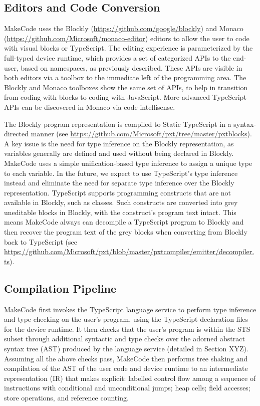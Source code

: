 \subsection{Editors and Code Conversion}

MakeCode uses the Blockly (\url{https://github.com/google/blockly}) and Monaco 
(\url{https://github.com/Microsoft/monaco-editor}) editors to allow the user to code with
visual blocks or TypeScript. The editing experience is parameterized by the full-typed device
runtime, which provides a set of categorized APIs to the end-user, based on namespaces, as
previously described. These APIs are visible in both editors via a toolbox to the immediate
left of the programming area. The Blockly and Monaco toolboxes show the same set of APIs, to
help in transition from coding with blocks to coding with JavaScript. More advanced TypeScript
APIs can be discovered in Monaco via code intellisense.

The Blockly program representation is compiled to Static TypeScript in a syntax-directed manner
(see \url{https://github.com/Microsoft/pxt/tree/master/pxtblocks}). A key issue is the need for
type inference on the Blockly representation, as variables generally are defined and used without
being declared in Blockly. MakeCode uses a simple unification-based type inference to assign a
unique type to each variable.  In the future, we expect to use TypeScript's type inference instead
and eliminate the need for separate type inference over the Blockly representation. 
TypeScript supports programming constructs that are not available in Blockly, such as classes.
Such constructs are converted into grey uneditable blocks in Blockly, with the construct's program
text intact. This means MakeCode always can decompile a TypeScript program to Blockly and then recover
the program text of the grey blocks when converting from Blockly back to TypeScript
 (see \url{https://github.com/Microsoft/pxt/blob/master/pxtcompiler/emitter/decompiler.ts}). 

\subsection{Compilation Pipeline}

MakeCode first invokes the TypeScript language service to perform type inference and type checking on the 
user's program, using the TypeScript declaration files for the device runtime.   It then checks that the
user's program is within the STS subset through additional syntactic and type checks over the adorned
abstract syntax tree (AST) produced by the language service (detailed in Section XYZ).  Assuming all the
above checks pass, MakeCode then performs tree shaking and compilation of the AST of the user code and
device runtime to an intermediate representation (IR) that makes explicit: labelled control flow among a
sequence of instructions with conditional and unconditional jumps; heap cells; field accesses; store operations,
and reference counting.

